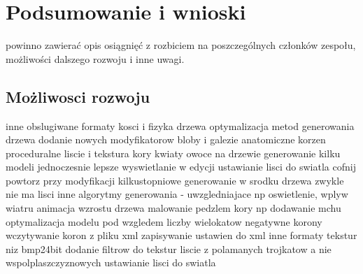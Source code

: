 

\chapter{Podsumowanie i wnioski}
powinno zawierać opis osiągnięć z rozbiciem na poszczególnych
członków zespołu, możliwości dalszego rozwoju i inne uwagi.
\section{Możliwosci rozwoju}
inne obslugiwane formaty
kosci i fizyka drzewa
optymalizacja metod generowania drzewa
dodanie nowych modyfikatorow
bloby i galezie anatomiczne
korzen
proceduralne liscie i tekstura kory
kwiaty owoce na drzewie
generowanie kilku modeli jednoczesnie
lepsze wyswietlanie w edycji
ustawianie lisci do swiatla
cofnij powtorz przy modyfikacji
kilkustopniowe generowanie
w srodku drzewa zwykle nie ma lisci 
inne algorytmy generowania  - uwzgledniajace np oswietlenie, wplyw wiatru
animacja wzrostu drzewa
malowanie pedzlem kory np dodawanie mchu
optymalizacja modelu pod wzgledem liczby wielokatow
negatywne korony
wczytywanie koron z pliku xml
zapisywanie ustawien do xml
inne formaty tekstur niz bmp24bit
dodanie filtrow do tekstur
liscie z polamanych trojkatow a nie wspolplaszczyznowych
ustawianie lisci do swiatla